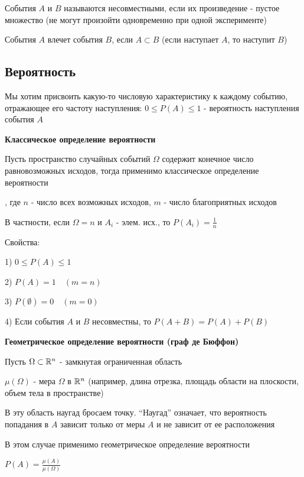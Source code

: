 \documentclass[12pt]{article}
\begin{document}
     События $A$ и $B$ называются несовместными, если их произведение - пустое множество
    (не могут произойти одновременно при одной эксперименте)

     События $A$ влечет события $B$, если $A \subset B$ (если наступает $A$, то наступит $B$)

    \subsection{Вероятность}

    Мы хотим присвоить какую-то числовую характеристику к каждому событию,
    отражающее его частоту наступления: $0 \leq P(A) \leq 1$ - вероятность наступления события $A$

    \mediumvspace

    \textbf{Классическое определение вероятности}

    Пусть пространство случайных событий $\Omega$ содержит конечное число равновозможных исходов,
    тогда применимо классическое определение вероятности

    \Def {}, где $n$ - число всех возможных исходов, $m$ - число благоприятных исходов

    В частности, если $\Omega = n$ и $A_i$ - элем. исх., то $P(A_i) = \frac{1}{n}$

    Свойства:

    1) $0 \leq P(A) \leq 1$

    2) $P(A) = 1 \quad (m = n)$

    3) $P(\emptyset) = 0 \quad (m = 0)$

    4) Если события $A$ и $B$ несовместны, то $P(A + B) = P(A) + P(B)$

    \mediumvspace

    \textbf{Геометрическое определение вероятности (граф де Бюффон)}

    Пусть $\Omega \subset \mathbb{R}^n$ - замкнутая ограниченная область

    $\mu(\Omega)$ - мера $\Omega$ в $\mathbb{R}^n$ (например, длина отрезка, площадь области на плоскости, объем тела в пространстве)

    В эту область наугад бросаем точку. \enquote{Наугад} означает, что вероятность попадания в $A$ зависит только от меры $A$ и не зависит от ее расположения

    В этом случае применимо геометрическое определение вероятности

    $P(A) = \frac{\mu(A)}{\mu(\Omega)}$
\end{document}
